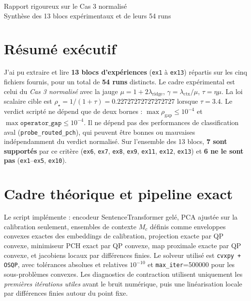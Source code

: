 \documentclass[11pt,a4paper]{article}
\newcommand{\code}[1]{\texttt{#1}}
\begin{document}
\begin{center}
{\LARGE Rapport rigoureux sur le Cas 3 normalisé}\\[0.5em]
{\large Synthèse des 13 blocs expérimentaux et de leurs 54 runs}\\[1em]
\end{center}
\section*{Résumé exécutif}
J'ai pu extraire et lire \textbf{13 blocs d'expériences} (\code{ex1} à \code{ex13}) répartis sur les cinq fichiers fournis, pour un total de \textbf{54 runs} distincts. Le cadre expérimental est celui du \emph{Cas 3 normalisé} avec la jauge $\mu = 1 + 2\lambda_{\mathrm{ridge}}$, $\gamma = \lambda_{\mathrm{ctx}}/\mu$, $\tau = \eta\mu$. La loi scalaire cible est $\rho_\star = 1/(1+\tau) = 0.22727272727272727$ lorsque $\tau=3.4$.
Le verdict scripté ne dépend que de deux bornes : $\max \rho_{\mathrm{gap}} \le 10^{-4}$ et $\max \texttt{operator\_gap} \le 10^{-4}$. Il ne dépend pas des performances de classification aval (\code{probe\_routed\_pch}), qui peuvent être bonnes ou mauvaises indépendamment du verdict normalisé.
Sur l'ensemble des 13 blocs, \textbf{7 sont supportés} par ce critère (\code{ex6}, \code{ex7}, \code{ex8}, \code{ex9}, \code{ex11}, \code{ex12}, \code{ex13}) et \textbf{6 ne le sont pas} (\code{ex1}--\code{ex5}, \code{ex10}).
\section*{Cadre théorique et pipeline exact}
Le script implémente : encodeur SentenceTransformer gelé, PCA ajustée sur la calibration seulement, ensembles de contexte $M_c$ définis comme enveloppes convexes exactes des embeddings de calibration, projection exacte par QP convexe, minimiseur PCH exact par QP convexe, map proximale exacte par QP convexe, et jacobiens locaux par différences finies.
Le solveur utilisé est \code{cvxpy + OSQP}, avec tolérances absolues et relatives $10^{-10}$ et \code{max\_iter}=500000 pour les sous-problèmes convexes.
Les diagnostics de contraction utilisent uniquement les \emph{premières itérations utiles} avant le bruit numérique, puis une linéarisation locale par différences finies autour du point fixe.
\end{document}
